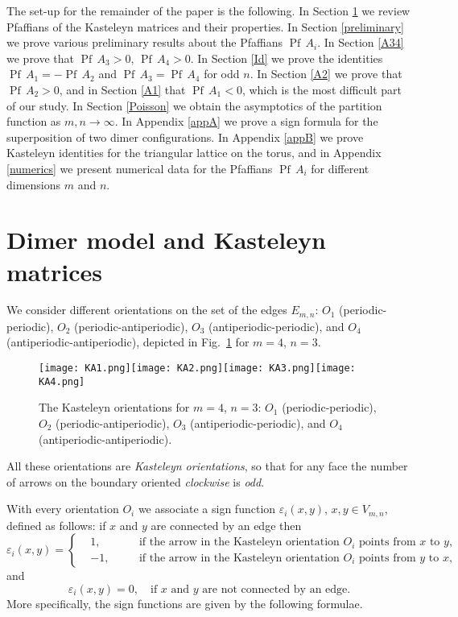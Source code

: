 \documentclass[12pt,reqno]{amsart}
\numberwithin{equation}{section}
\newcommand{\ep}{\varepsilon}
\newcommand{\Pf}{{\operatorname{Pf}\,}}
\begin{document}
The set-up for the remainder of the paper is the following. In Section
\ref{Kasteleyn} we review Pfaffians of the  Kasteleyn matrices and their properties. In Section \ref{preliminary} we prove various preliminary
results about the Pfaffians $\Pf A_i$. In Section \ref{A34}
we prove that $\Pf A_3>0$, $\Pf A_4>0$. In Section \ref{Id} we prove the identities $\Pf A_1=-\Pf A_2$ and $\Pf A_3=\Pf A_4$ for odd $n$.  In Section \ref{A2} we prove that
$\Pf A_2>0$, and in Section \ref{A1} that
$\Pf A_1<0$, which is the most difficult part of our study. 
In Section \ref{Poisson} we obtain the asymptotics of the partition function  as $m,n\to\infty$. In Appendix \ref{appA} we prove a sign formula 
for the superposition of two dimer configurations. In Appendix \ref{appB} we prove Kasteleyn identities for the triangular lattice on the torus, and in Appendix \ref{numerics} we present numerical data for the Pfaffians $\Pf A_i$ for different dimensions $m$ and $n$.

\section{Dimer model and Kasteleyn matrices}\label{Kasteleyn}

We consider different orientations on the set of the edges $E_{m,n}$: 
$O_1$ (periodic-periodic),  $O_2$ (periodic-antiperiodic),  
$O_3$ (antiperiodic-periodic), and $O_4$
 (antiperiodic-antiperiodic), depicted in Fig.\ \ref{KOs} for $m=4$, $n=3$. 
\begin{figure}[h!]
\texttt{[image: KA1.png]}\hspace{.35in}\texttt{[image: KA2.png]}\hspace{.35in}\texttt{[image: KA3.png]}\hspace{.35in}\texttt{[image: KA4.png]}
\caption{The Kasteleyn orientations for $m=4$, $n=3$: $O_1$ (periodic-periodic),  $O_2$ (periodic-antiperiodic),  $O_3$ (antiperiodic-periodic), and
 $O_4$ (antiperiodic-antiperiodic).}
\label{KOs}
\end{figure}
All these orientations are  {\it Kasteleyn orientations}, so that for any face
the number of arrows on the boundary oriented {\it clockwise} is {\it odd}.

With every orientation $O_i$ we associate a sign function $\ep_i(x,y)$,
$x,y\in V_{m,n}$, defined as follows: if $x$ and $y$ are connected by an edge then
\begin{equation}\label{Aj3}
\ep_i(x,y)=\left\{
\begin{alignedat}{2}
&1,\quad &&\textrm{if the arrow in the Kasteleyn orientation $O_i$ points from $x$ to $y$,}\\
& -1, \quad &&\textrm{if the arrow in the Kasteleyn orientation $O_i$ points from $y$ to $x$,}
\end{alignedat}\right.
\end{equation}
and 
\begin{equation}\label{Aj3a}
\ep_i(x,y)=0,\quad \textrm{if $x$ and $y$ are not connected by an edge.}
\end{equation}
More specifically, the sign functions are given by the following formulae. 
\end{document}
